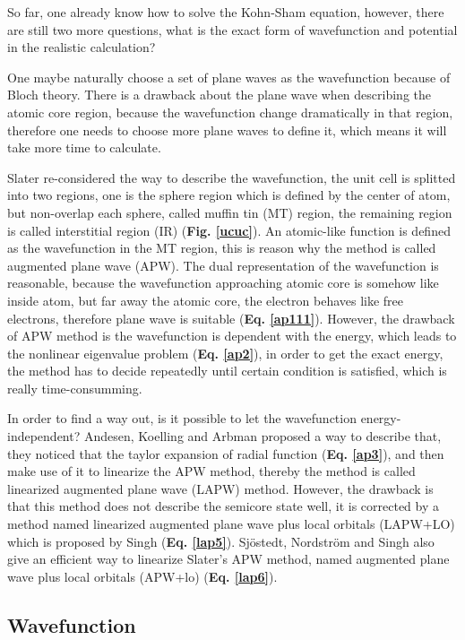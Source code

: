 \documentclass[a4paper, 12pt, titlepage,oneside,drop]{kthesis}
\begin{document}
So far, one already know how to solve the Kohn-Sham equation, however, there are still two more questions, what is the exact form of 
wavefunction and potential in the realistic calculation?  

One maybe naturally choose a set of plane waves as the wavefunction because of Bloch theory. There is a drawback about the plane wave 
when describing the atomic core region, because the wavefunction change dramatically in that region, therefore one needs to choose more plane
waves to define it, which means it will take more time to calculate.

Slater re-considered the way to describe the wavefunction, the unit cell is splitted into two regions, one is the sphere region which is
defined by the center of atom, but non-overlap each sphere, called muffin tin (MT) region, the remaining region is called interstitial 
region (IR) (\textbf{Fig. \ref{ucuc}}). An atomic-like function is defined as the wavefunction in the MT region, this is reason why the method is called augmented plane wave (APW).
The dual representation of the wavefunction is reasonable, because the wavefunction approaching atomic core is somehow like inside atom, but far away the atomic core, the electron behaves like free electrons,
therefore plane wave is suitable (\textbf{Eq. \ref{ap111}}). However, the drawback of APW method is the wavefunction is dependent with the energy, which leads to the 
nonlinear eigenvalue problem (\textbf{Eq. \ref{ap2}}), in order to get the exact energy, the method has to decide repeatedly until certain condition is satisfied,
which is really time-consumming.

In order to find a way out, is it possible to let the wavefunction energy-independent? Andesen, Koelling and Arbman proposed a way to describe that,
they noticed that the taylor expansion of radial function (\textbf{Eq. \ref{ap3}}), and then make use of it to linearize the APW method, thereby the method is called linearized augmented plane wave (LAPW)
method. However, the drawback is that this method does not describe the semicore state well, it is corrected by a method named linearized augmented plane wave plus local orbitals (LAPW+LO) which is proposed by Singh (\textbf{Eq. \ref{lap5}}).
Sjöstedt, Nordström and Singh also give an efficient way to linearize Slater's APW method, named augmented plane wave plus local orbitals (APW+lo) (\textbf{Eq. \ref{lap6}}). 

\subsection{Wavefunction}
\end{document}
